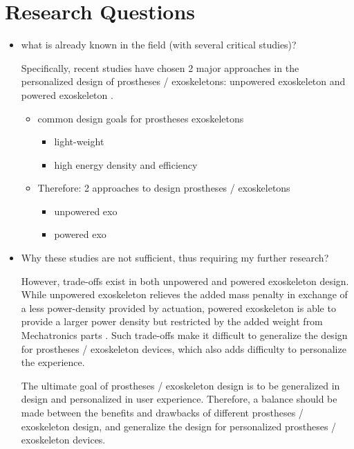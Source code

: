\documentclass{article}
\begin{document}
\section{Research Questions}

\begin{itemize}
    \item what is already known in the field (with several critical studies)?
    
    Specifically, recent studies have chosen 2 major approaches in the personalized design of prostheses / exoskeletons: unpowered exoskeleton \cite{UnpoweredExo} and powered exoskeleton \cite{OSL2020}. 

    \begin{itemize}
        \item common design goals for prostheses exoskeletons
        \begin{itemize}
            \item light-weight \cite{ProsthesisOverview}
            \item high energy density and efficiency \cite{OSLSpring}
        \end{itemize}
        \item Therefore: 2 approaches to design prostheses / exoskeletons
        \begin{itemize}
            \item unpowered exo \cite{UnpoweredExo}
            \item powered exo \cite{OSL2020}
        \end{itemize}
    \end{itemize}

    \item Why these studies are not sufficient, thus requiring my further research?
    
    However, trade-offs exist in both unpowered and powered exoskeleton design. While unpowered exoskeleton relieves the added mass penalty in exchange of a less power-density provided by actuation, powered exoskeleton is able to provide a larger power density but restricted by the added weight from Mechatronics parts \cite{tetheredExoBenefits}. Such trade-offs make it difficult to generalize the design for prostheses / exoskeleton devices, which also adds difficulty to personalize the experience. 
    
    The ultimate goal of prostheses / exoskeleton design is to be generalized in design and personalized in user experience. Therefore, a balance should be made between the benefits and drawbacks of different prostheses / exoskeleton design, and generalize the design for personalized prostheses / exoskeleton devices.


\end{itemize}
\end{document}
